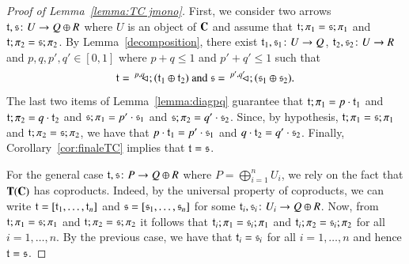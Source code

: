 \begin{proof}[Proof of Lemma~\ref{lemma:TC jmono}]
     First, we consider two arrows $\mathfrak{t},\mathfrak{s}\colon U \to Q\oplus R$ where $U$ is an object of $\mathbf{C}$ and assume that $\mathfrak{t};\pi_1 = \mathfrak{s};\pi_1$ and $\mathfrak{t};\pi_2 = \mathfrak{s};\pi_2$. By Lemma~\ref{decomposition}, there exist $\mathfrak{t}_1,\mathfrak{s}_1\colon U \to Q$, $\mathfrak{t}_2,\mathfrak{s}_2\colon U \to R$ and $p,q,p',q'\in [0,1]$ where $p+q\le 1$ and $p'+q'\le 1$ such that
     \[\mathfrak{t}=\, ^{p,q}\!\! \lhd_{};(\mathfrak{t}_1 \oplus \mathfrak{t}_2) \text{ and }\mathfrak{s}=\,^{p',q'}\!\! \lhd_{};(\mathfrak{s}_1 \oplus \mathfrak{s}_2)\text{.}\]
The last two items of Lemma~\ref{lemma:diagpq} guarantee that $\mathfrak{t};\pi_1 = p\cdot \mathfrak{t}_1$ and $\mathfrak{t};\pi_2 = q\cdot \mathfrak{t}_2$ and $\mathfrak{s};\pi_1 = p'\cdot \mathfrak{s}_1$ and $\mathfrak{s};\pi_2 = q'\cdot \mathfrak{s}_2$. Since, by hypothesis, $\mathfrak{t};\pi_1 = \mathfrak{s};\pi_1$ and $\mathfrak{t};\pi_2 = \mathfrak{s};\pi_2$, we have that $p\cdot \mathfrak{t}_1 = p'\cdot \mathfrak{s}_1$ and $q\cdot \mathfrak{t}_2 = q'\cdot \mathfrak{s}_2$. 
    Finally, Corollary~\ref{cor:finaleTC} implies that $\mathfrak{t}=\mathfrak{s}$.
    
    
    For the general case $\mathfrak{t},\mathfrak{s}\colon P\to Q\oplus R$ where $P=\bigoplus_{i=1}^n U_i$, we rely on the fact that $\mathbf{T}(\mathbf{C})$ has coproducts. Indeed, by the universal property of coproducts, we can write $\mathfrak{t} = [\mathfrak{t}_1,\dots,\mathfrak{t}_n]$ and $\mathfrak{s} = [\mathfrak{s}_1,\dots,\mathfrak{s}_n]$ for some $\mathfrak{t}_i,\mathfrak{s}_i\colon U_i \to Q\oplus R$. Now, from $\mathfrak{t};\pi_1 = \mathfrak{s};\pi_1$ and $\mathfrak{t};\pi_2 = \mathfrak{s};\pi_2$ it follows that $\mathfrak{t}_i;\pi_1 = \mathfrak{s}_i;\pi_1$ and $\mathfrak{t}_i;\pi_2 = \mathfrak{s}_i;\pi_2$ for all $i=1,\dots,n$. By the previous case, we have that $\mathfrak{t}_i=\mathfrak{s}_i$ for all $i=1,\dots,n$ and hence $\mathfrak{t}=\mathfrak{s}$.
\end{proof}



